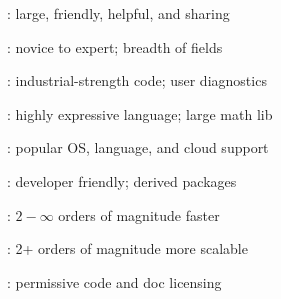 \documentclass[10pt]{report}
\begin{document}
\vspace*{3pt}
\begin{subitemize}
\item {}: large, friendly, helpful, and sharing
\item {}:  novice to expert; breadth of fields
\item {}:  industrial-strength code; user diagnostics
\item {}:  highly expressive language;  large math lib
\item {}: popular OS, language, and cloud support
\item {}: developer friendly; derived packages
\item {}:  $2-\infty$ orders of magnitude faster
\item {}:  2+ orders of magnitude more scalable
\item {}: permissive code and doc licensing
\end{subitemize}
\end{document}
